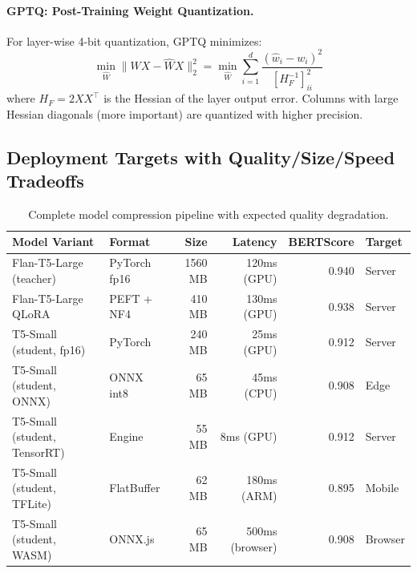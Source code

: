 \documentclass[11pt, a4paper]{article}
\begin{document}
\paragraph{GPTQ: Post-Training Weight Quantization.}
For layer-wise 4-bit quantization, GPTQ minimizes:
\begin{equation}
\min_{\hat{W}} \| WX - \hat{W}X \|_2^2 = \min_{\hat{W}} \sum_{i=1}^{d} \frac{(\hat{w}_i - w_i)^2}{[H_F^{-1}]_{ii}^2}
\end{equation}
where $H_F = 2XX^\top$ is the Hessian of the layer output error. Columns with large Hessian diagonals (more important) are quantized with higher precision.

\subsection{Deployment Targets with Quality/Size/Speed Tradeoffs}

\begin{table}[H]
\centering
\small
\begin{tabular}{llrrrl}
\toprule
\textbf{Model Variant} & \textbf{Format} & \textbf{Size} & \textbf{Latency} & \textbf{BERTScore} & \textbf{Target} \\
\midrule
Flan-T5-Large (teacher) & PyTorch fp16 & 1560 MB & 120ms (GPU) & 0.940 & Server \\
Flan-T5-Large QLoRA & PEFT + NF4 & 410 MB & 130ms (GPU) & 0.938 & Server \\
T5-Small (student, fp16) & PyTorch & 240 MB & 25ms (GPU) & 0.912 & Server \\
T5-Small (student, ONNX) & ONNX int8 & 65 MB & 45ms (CPU) & 0.908 & Edge \\
T5-Small (student, TensorRT) & Engine & 55 MB & 8ms (GPU) & 0.912 & Server \\
T5-Small (student, TFLite) & FlatBuffer & 62 MB & 180ms (ARM) & 0.895 & Mobile \\
T5-Small (student, WASM) & ONNX.js & 65 MB & 500ms (browser) & 0.908 & Browser \\
\bottomrule
\end{tabular}
\caption{Complete model compression pipeline with expected quality degradation.}
\end{table}
\end{document}
